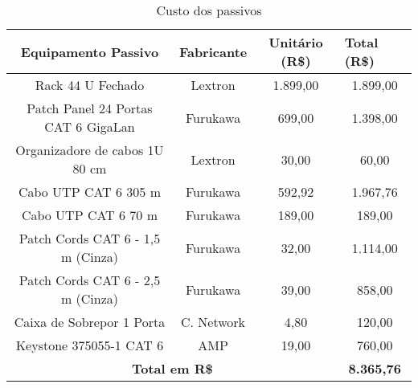 \begin{table}[h!]
		\begin{center}
	\caption{Custo dos passivos}
	\label{tab10}
	\renewcommand{\arraystretch}{1.5}
\begin{tabular}{|c|c|c|c|}
	\hline
	\textbf{Equipamento Passivo}                 & \textbf{Fabricante} & \textbf{ Unitário (R\$)} & \multicolumn{1}{l|}{\textbf{Total (R\$)}} \\ \hline
	Rack 44 U Fechado                            & Lextron             & 1.899,00                         & 1.899,00                                           \\ \hline
	Patch Panel 24 Portas CAT 6 GigaLan  & Furukawa            & 699,00                           & 1.398,00                                           \\ \hline
	Organizadore de cabos 1U 80 cm               & Lextron             & 30,00                            & 60,00                                              \\ \hline
	Cabo UTP CAT 6  305 m           & Furukawa            & 592,92                           & 1.967,76                                           \\ \hline
	Cabo UTP CAT 6  70 m            & Furukawa            & 189,00                           & 189,00                                             \\ \hline
	Patch Cords CAT 6 - 1,5 m (Cinza)            & Furukawa            & 32,00                            & 1.114,00                                           \\ \hline
	Patch Cords CAT 6 - 2,5 m (Cinza)            & Furukawa            & 39,00                            & 858,00                                             \\ \hline
	Caixa de Sobrepor 1 Porta                          & C. Network                & 4,80                             & 120,00                                             \\ \hline
	Keystone 375055-1
	CAT 6                             & AMP                 & 19,00                            & 760,00                                             \\ \hline
	\multicolumn{3}{|c|}{\textbf{Total em R\$}}                                                           & \textbf{8.365,76}                                  \\ \hline
\end{tabular}
\end{center}
\end{table}